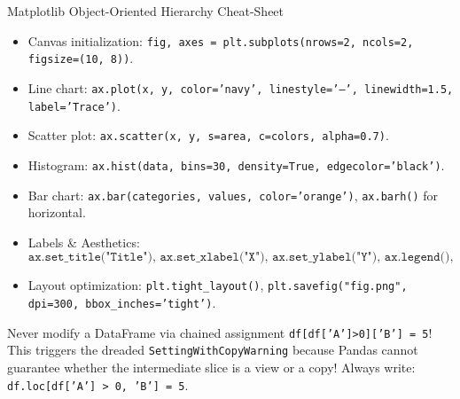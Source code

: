 \begin{formulabox}{Matplotlib Object-Oriented Hierarchy Cheat-Sheet}
\begin{itemize}[leftmargin=1.5em, itemsep=2pt]
    \item Canvas initialization: \texttt{fig, axes = plt.subplots(nrows=2, ncols=2, figsize=(10, 8))}.
    \item Line chart: \texttt{ax.plot(x, y, color='navy', linestyle='--', linewidth=1.5, label='Trace')}.
    \item Scatter plot: \texttt{ax.scatter(x, y, s=area, c=colors, alpha=0.7)}.
    \item Histogram: \texttt{ax.hist(data, bins=30, density=True, edgecolor='black')}.
    \item Bar chart: \texttt{ax.bar(categories, values, color='orange')}, \texttt{ax.barh()} for horizontal.
    \item Labels \& Aesthetics:
    \begin{equation*}
    \texttt{ax.set\_title("Title"), ax.set\_xlabel("X"), ax.set\_ylabel("Y"), ax.legend(), ax.grid(True)}
    \end{equation*}
    \item Layout optimization: \texttt{plt.tight\_layout()}, \texttt{plt.savefig("fig.png", dpi=300, bbox\_inches='tight')}.
\end{itemize}
\end{formulabox}

\begin{memorytip}
Never modify a DataFrame via chained assignment \texttt{df[df['A']>0]['B'] = 5}! This triggers the dreaded \texttt{SettingWithCopyWarning} because Pandas cannot guarantee whether the intermediate slice is a view or a copy! Always write: \texttt{df.loc[df['A'] > 0, 'B'] = 5}.
\end{memorytip}
